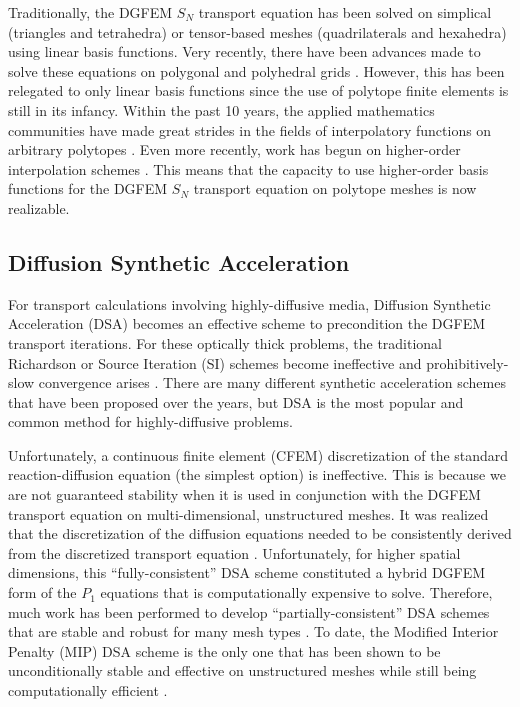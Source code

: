 Traditionally, the DGFEM $S_N$ transport equation has been solved on simplical (triangles and tetrahedra) or tensor-based meshes (quadrilaterals and hexahedra) using linear basis functions. Very recently, there have been advances made to solve these equations on polygonal and polyhedral grids \cite{davidson2008finite,ref::PWLD_stone_adams,ref::PWLD_stone_adams_unstructured,bailey2008phd}. However, this has been relegated to only linear basis functions since the use of polytope finite elements is still in its infancy. Within the past 10 years, the applied mathematics communities have made great strides in the fields of interpolatory functions on arbitrary polytopes \cite{sukumar2006recent}. Even more recently, work has begun on higher-order interpolation schemes \cite{rand2013interpolation}. This means that the capacity to use higher-order basis functions for the DGFEM $S_N$ transport equation on polytope meshes is now realizable. 

\subsection{Diffusion Synthetic Acceleration}
\label{sec::Intro_Past_DSA}

For transport calculations involving highly-diffusive media, Diffusion Synthetic Acceleration (DSA) becomes an effective scheme to precondition the DGFEM transport iterations. For these optically thick problems, the traditional Richardson or Source Iteration (SI) schemes become ineffective and prohibitively-slow convergence arises \cite{ref::adams_larsen_iter_methods}. There are many different synthetic acceleration schemes that have been proposed over the years, but DSA is the most popular and common method for highly-diffusive problems.

Unfortunately, a continuous finite element (CFEM) discretization of the standard reaction-diffusion equation (the simplest option) is ineffective. This is because we are not guaranteed stability when it is used in conjunction with the DGFEM transport equation on multi-dimensional, unstructured meshes. It was realized that the discretization of the diffusion equations needed to be consistently derived from the discretized transport equation \cite{alcouffe1976stable,alcouffe1977DSA,larsen1982unconditionally_I,larsen1982unconditionally_II,warsa2002fully}. Unfortunately, for higher spatial dimensions, this ``fully-consistent'' DSA scheme constituted a hybrid DGFEM form of the $P_1$ equations that is computationally expensive to solve. Therefore, much work has been performed to develop ``partially-consistent'' DSA schemes that are stable and robust for many mesh types \cite{ref::dsa_DFEM_adams_martin,wareing1991diffusion,ref::DSA_wang_ragusa}. To date, the Modified Interior Penalty (MIP) DSA scheme is the only one that has been shown to be unconditionally stable and effective on unstructured meshes while still being computationally efficient \cite{ref::DSA_wang_ragusa,turcksin2014discontinuous}.

